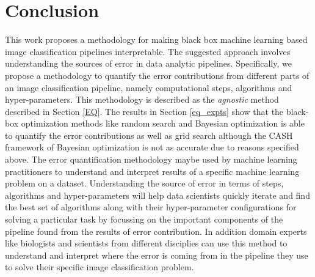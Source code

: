 \section{Conclusion}
This work proposes a methodology for making black box machine learning based image classification pipelines interpretable. The suggested approach involves understanding the sources of error in data analytic pipelines. Specifically, we propose a methodology to quantify the error contributions from different parts of an image classification pipeline, namely computational steps, algorithms and hyper-parameters. This methodology is described as the \textit{agnostic} method described in Section \ref{EQ}. The results in Section \ref{eq_expts} show that the black-box optimization methods like random search and Bayesian optimization is able to quantify the error contributions as well as grid search although the CASH framework of Bayesian optimization is not as accurate due to reasons specified above. The error quantification methodology maybe used by machine learning practitioners to understand and interpret results of a specific machine learning problem on a dataset. Understanding the source of error in terms of steps, algorithms and hyper-parameters will help data scientists quickly iterate and find the best set of algorithms along with their hyper-parameter configurations for solving a particular task by focussing on the important components of the pipeline found from the results of error contribution. In addition domain experts like biologists and scientists from different disciplies can use this method to understand and interpret where the error is coming from in the pipeline they use to solve their specific image classification problem.
